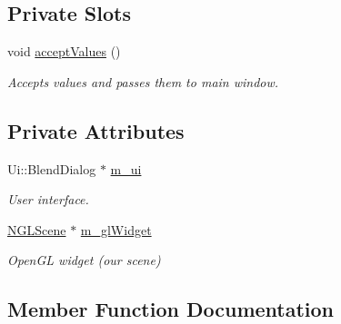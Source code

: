 \subsection*{Private Slots}
\begin{DoxyCompactItemize}
\item 
void \hyperlink{class_blend_dialog_a880b7e5b3f0d8f7a2d2c7b25e4ad8d14}{accept\+Values} ()\hypertarget{class_blend_dialog_a880b7e5b3f0d8f7a2d2c7b25e4ad8d14}{}\label{class_blend_dialog_a880b7e5b3f0d8f7a2d2c7b25e4ad8d14}

\begin{DoxyCompactList}\small\item\em Accepts values and passes them to main window. \end{DoxyCompactList}\end{DoxyCompactItemize}
\subsection*{Private Attributes}
\begin{DoxyCompactItemize}
\item 
Ui\+::\+Blend\+Dialog $\ast$ \hyperlink{class_blend_dialog_a71794e489a608ba7a81575908088d5ad}{m\+\_\+ui}\hypertarget{class_blend_dialog_a71794e489a608ba7a81575908088d5ad}{}\label{class_blend_dialog_a71794e489a608ba7a81575908088d5ad}

\begin{DoxyCompactList}\small\item\em User interface. \end{DoxyCompactList}\item 
\hyperlink{class_n_g_l_scene}{N\+G\+L\+Scene} $\ast$ \hyperlink{class_blend_dialog_a46e85a3d6b0b75fde3dae06da0be43dc}{m\+\_\+gl\+Widget}\hypertarget{class_blend_dialog_a46e85a3d6b0b75fde3dae06da0be43dc}{}\label{class_blend_dialog_a46e85a3d6b0b75fde3dae06da0be43dc}

\begin{DoxyCompactList}\small\item\em Open\+GL widget (our scene) \end{DoxyCompactList}\end{DoxyCompactItemize}


\subsection{Member Function Documentation}
